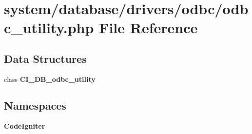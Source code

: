 \section{system/database/drivers/odbc/odbc\-\_\-utility.php File Reference}
\label{odbc__utility_8php}
\subsection*{Data Structures}
\begin{DoxyCompactItemize}
\item 
class {\bf C\-I\-\_\-\-D\-B\-\_\-odbc\-\_\-utility}
\end{DoxyCompactItemize}
\subsection*{Namespaces}
\begin{DoxyCompactItemize}
\item 
{\bf Code\-Igniter}
\end{DoxyCompactItemize}
